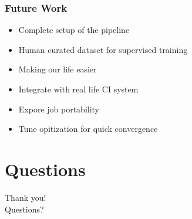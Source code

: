 \documentclass[aspectratio=169,11pt,hyperref={colorlinks=true}]{beamer}
\begin{document}
\begin{frame}
  \frametitle{Future Work}
  \begin{itemize}
      \item{Complete setup of the pipeline}
      \item{Human curated dataset for supervised training}
      \item{Making our life easier}
      \item{Integrate with real life CI system}
      \item{Expore job portability}
      \item{Tune opitization for quick convergence}
  \end{itemize}
\end{frame}

\section{Questions}
\begin{frame}[c]
    \begin{center}
        \Huge Thank you!\\Questions?
    \end{center}
\end{frame}
\end{document}
